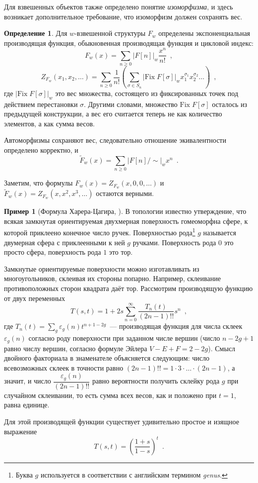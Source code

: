 \documentclass{article}
\theoremstyle{definition}
\newtheorem{example}{Пример}
\newtheorem*{definition}{Определение}
\begin{document}
Для взвешенных объектов также определено понятие \textit{изоморфизма}, и здесь
возникает дополнительное требование, что изоморфизм должен сохранять вес.

\begin{definition}
    Для \(w\)-взвешенной структуры \( F_w \) определены экспоненциальная
производящая функция, обыкновенная производящая функция и цикловой индекс:
\[
    F_w(x) = \sum_{n \geq 0} |F[n]|_w \dfrac{x^n}{n!} \enspace ,
\]
\[
    Z_{F_w} (x_1, x_2, \ldots) = \sum_{n \geq 0} \dfrac{1}{n!} \left(
        \sum_{\sigma \in S_n} |\mathrm{Fix}\; F[\sigma]|_w x_1^{\sigma_1}
x_2^{\sigma_2} \ldots
    \right)
    \enspace ,
\]
где \( |\mathrm{Fix}\; F[\sigma]|_w \) это вес множества, состоящего из
фиксированных точек под действием перестановки \( \sigma \). Другими словами,
множество \( \mathrm{Fix}\; F[\sigma] \) осталось из предыдущей конструкции, а
вес его считается теперь не как количество элементов, а как сумма весов.

Автоморфизмы сохраняют вес, следовательно отношение экивалентности определено
корректно, и 
\[
     \widetilde F_w (x) = \sum_{n \geq 0} |F[n] / \sim |_w x^n \enspace .
\]
\end{definition}

Заметим, что формулы \( F_w(x) = Z_{F_w} (x, 0, 0, \ldots) \) и \( \widetilde
F_{w} (x) = Z_{F_w} (x, x^2, x^3, \ldots) \) остаются верными. 

\begin{example}[Формула Харера-Цагира, \cite{lando, pittel}]
\label{example:harer-zagier}
    В топологии известно утверждение, что всякая замкнутая ориентируемая
двухмерная поверхность гомеоморфна сфере, к которой приклеено конечное число
ручек. Поверхностью рода\footnote{Буква \( g \) используется в соответствии с
английским термином \textit{genus}.} \( g \) называется 
двумерная сфера с приклеенными к ней \( g \) ручками. Поверхность рода \( 0 \)
это просто сфера, поверхность рода \( 1 \) это тор. 

Замкнутые ориентируемые поверхности можно изготавливать из многоугольников,
склеивая их стороны попарно. Например, склеивание противоположных сторон
квадрата даёт тор. Рассмотрим производящую функцию от двух переменных
\[
    T(s, t) = 1 + 2 s \sum_{n = 0}^\infty \dfrac{T_n(t)}{(2n-1)!!} s^n \enspace
, 
\]
где \( T_n(t) = \sum_{g} \varepsilon_g(n) t^{n+1-2g} \)~--- производящая функция
для числа склеек \( \varepsilon_g(n) \) согласно роду поверхности при заданном
числе вершин (число \( n - 2g + 1 \) равно числу вершин, согласно формуле Эйлера
\( V-E+F = 2 - 2g \)).
Смысл двойного факториала в знаменателе объясняется следующим: число
всевозможных склеек в точности равно \( (2n-1)!! = 1 \cdot 3 \cdot \ldots \cdot
(2n-1) \), а значит, и число \( \dfrac{\varepsilon_g(n)}{(2n-1)!!} \) равно
вероятности получить склейку рода \( g \) при случайном склеивании, то есть
сумма всех весов, как и положено при \( t = 1 \), равна единице. 

Для этой производящей функции существует удивительно простое и изящное выражение 
\[
    T(s, t) = \left(
        \dfrac{1+s}{1-s}
    \right)^t \enspace .
\]
\end{example}
\end{document}
